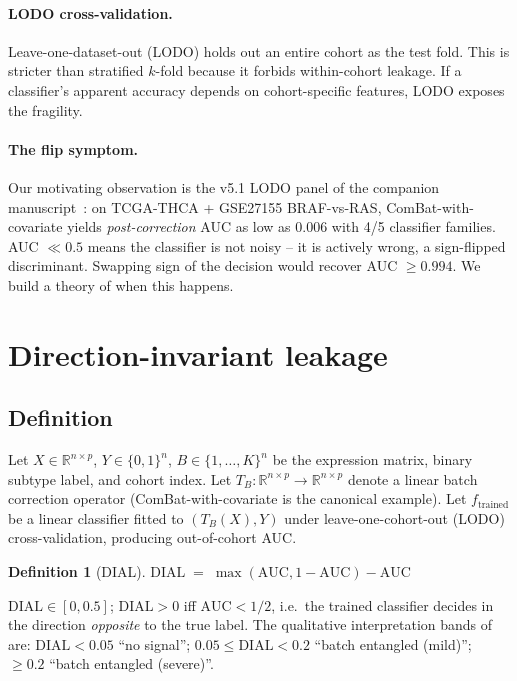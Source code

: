 \documentclass[letterpaper,11pt]{article}
\newtheorem{definition}{Definition}
\newcommand{\R}{\mathbb{R}}
\begin{document}
\paragraph{LODO cross-validation.}
Leave-one-dataset-out (LODO) holds out an entire cohort as the test
fold. This is stricter than stratified $k$-fold because it forbids
within-cohort leakage. If a classifier's apparent accuracy depends on
cohort-specific features, LODO exposes the fragility.

\paragraph{The flip symptom.}
Our motivating observation is the v5.1 LODO panel of the companion
manuscript~\cite{thcadash_bioinfo_2026}: on TCGA-THCA + GSE27155
BRAF-vs-RAS, ComBat-with-covariate yields \emph{post-correction} AUC
as low as $0.006$ with 4/5 classifier families. AUC $\ll 0.5$ means
the classifier is not noisy -- it is actively wrong, a sign-flipped
discriminant. Swapping sign of the decision would recover
AUC $\ge 0.994$. We build a theory of when this happens.

\section{Direction-invariant leakage}
\label{sec:dial}

\subsection{Definition}
Let $X\in\R^{n\times p}$, $Y\in\{0,1\}^{n}$, $B\in\{1,\dots,K\}^{n}$
be the expression matrix, binary subtype label, and cohort index.
Let $T_B:\R^{n\times p}\to\R^{n\times p}$ denote a linear batch
correction operator (ComBat-with-covariate is the canonical example).
Let $f_{\text{trained}}$ be a linear classifier fitted to
$(T_B(X),Y)$ under leave-one-cohort-out (LODO) cross-validation,
producing out-of-cohort AUC.

\begin{definition}[DIAL]
\label{def:dial}
$\mathrm{DIAL} \;=\; \max(\mathrm{AUC}, 1-\mathrm{AUC}) - \mathrm{AUC}$
\end{definition}

$\mathrm{DIAL}\in[0,0.5]$; $\mathrm{DIAL}>0$ iff $\mathrm{AUC}<1/2$,
i.e.\ the trained classifier decides in the direction \emph{opposite}
to the true label. The qualitative interpretation bands of
\cite{thcadash_bioinfo_2026} are: $\mathrm{DIAL}<0.05$ ``no signal'';
$0.05\le\mathrm{DIAL}<0.2$ ``batch entangled (mild)''; $\ge 0.2$
``batch entangled (severe)''.
\end{document}
